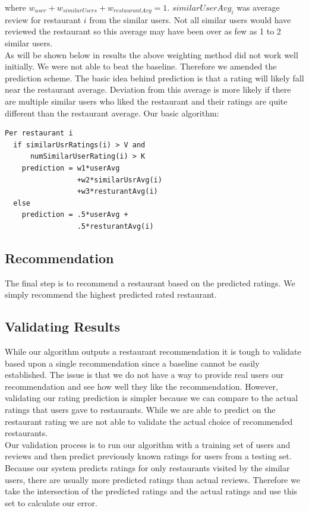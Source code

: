 \documentclass[10pt,twocolumn,letterpaper]{article}
\newcommand{\wu}{\ensuremath{w_{user}}}
\newcommand{\ws}{\ensuremath{w_{similarUsers}}}
\newcommand{\wrst}{\ensuremath{w_{restaurantAvg}}}
\begin{document}
 where $\wu + \ws + \wrst = 1$. $similarUserAvg_i$ was average review for restaurant $i$ from the similar users. Not all similar users would have reviewed the restaurant so this average may have been over as few as 1 to 2 similar users. 
\\[0.5em]
\indent As will be shown below in results the above weighting method did not work well initially. We were not able to beat the baseline. Therefore we amended the prediction scheme. The basic idea behind prediction is that a rating will likely fall near the restaurant average. Deviation from this average is more likely if there are multiple similar users who liked the restaurant and their ratings are quite different than the restaurant average. Our basic algorithm:
\begin{verbatim}
Per restaurant i
  if similarUsrRatings(i) > V and
      numSimilarUserRating(i) > K
    prediction = w1*userAvg
                 +w2*similarUsrAvg(i)
                 +w3*resturantAvg(i)
  else
    prediction = .5*userAvg +
                 .5*resturantAvg(i)
\end{verbatim}

\subsection{Recommendation}
The final step is to recommend a restaurant based on the predicted ratings. We simply recommend the highest predicted rated restaurant.

\subsection{Validating Results}
While our algorithm outputs a restaurant recommendation it is tough to validate based upon a single recommendation since a baseline cannot be easily established. The issue is that we do not have a way to provide real users our recommendation and see how well they like the recommendation. However, validating our rating prediction is simpler because we can compare to the actual ratings that users gave to restaurants. While we are able to predict on the restaurant rating we are not able to validate the actual choice of recommended restaurants.
\\[0.5em]
\indent Our validation process is to run our algorithm with a training set of users and reviews and then predict previously known ratings for users from a testing set. Because our system predicts ratings for only restaurants visited by the similar users, there are usually more predicted ratings than actual reviews. Therefore we take the intersection of the predicted ratings and the actual ratings and use this set to calculate our error.
\end{document}
